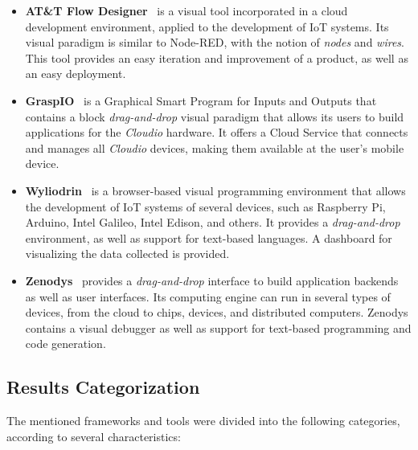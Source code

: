 \begin{itemize}
\item\textbf{AT\&T Flow Designer}~\cite{attflowdesigner} is a visual tool incorporated in a cloud development environment, applied to the development of IoT systems. Its visual paradigm is similar to Node-RED, with the notion of \textit{nodes} and \textit{wires}. This tool provides an easy iteration and improvement of a product, as well as an easy deployment.

\item\textbf{GraspIO}~\cite{graspio} is a Graphical Smart Program for Inputs and Outputs that contains a block \textit{drag-and-drop} visual paradigm that allows its users to build applications for the \textit{Cloudio} hardware. It offers a Cloud Service that connects and manages all \textit{Cloudio} devices, making them available at the user's mobile device.

\item\textbf{Wyliodrin}~\cite{wyliodrin} is a browser-based visual programming environment that allows the development of IoT systems of several devices, such as Raspberry Pi, Arduino, Intel Galileo, Intel Edison, and others. It provides a \textit{drag-and-drop} environment, as well as support for text-based languages. A dashboard for visualizing the data collected is provided.

\item\textbf{Zenodys}~\cite{zenodys} provides a \textit{drag-and-drop} interface to build application backends as well as user interfaces. Its computing engine can run in several types of devices, from the cloud to chips, devices, and distributed computers. Zenodys contains a visual debugger as well as support for text-based programming and code generation. 
\end{itemize}

\subsection{Results Categorization}\label{sec:slr_results_categorization}

The mentioned frameworks and tools were divided into the following categories, according to several characteristics:

